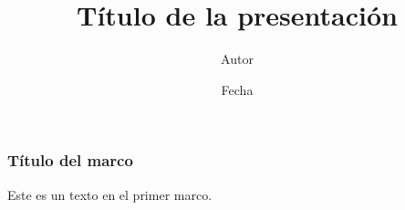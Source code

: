 \documentclass{beamer}
\title{Título de la presentación}
\author{Autor}
\institute{Institución}
\date{Fecha}
\begin{document}
\frame{\titlepage}
\begin{frame}
\frametitle{Título del marco}
Este es un texto en el primer marco.
\end{frame}
\end{document}
